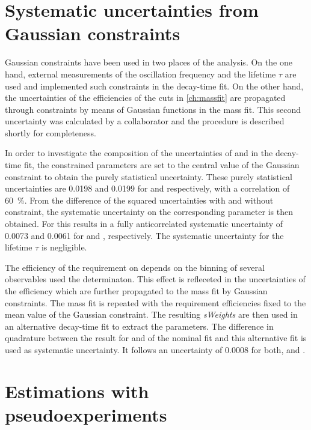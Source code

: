 \section{Systematic uncertainties from Gaussian constraints}
\label{sec:SystUncertsGauss}

Gaussian constraints have been used in two places of the analysis.
On the one hand, external measurements of the \Bz oscillation frequency \dm and the \Bz lifetime $\tau$ are used and implemented such constraints in the decay-time fit.
On the other hand, the uncertainties of the efficiencies of the \dllkpi cuts in \cref{ch:massfit} are propagated through constraints by means of Gaussian functions in the mass fit.
This second uncertainty was calculated by a collaborator and the procedure is described shortly for completeness.

In order to investigate the composition of the uncertainties of \Sf and \Sfbar in the decay-time fit, the constrained parameters are set to the central value of the Gaussian constraint to obtain the purely statistical uncertainty.
These purely statistical uncertainties are \num{0.0198} and \num{0.0199} for \Sf and \Sfbar respectively, with a correlation of \SI{60}{\percent}.
From the difference of the squared uncertainties with and without constraint, the systematic uncertainty on the corresponding parameter is then obtained.
For \dm this results in a fully anticorrelated systematic uncertainty of \num{0.0073} and \num{0.0061} for \Sf and \Sfbar, respectively.
The systematic uncertainty for the \Bz lifetime $\tau$ is negligible.

The efficiency of the requirement on \dllkpi depends on the binning of several observables used the determinaton.
This effect is refleceted in the uncertainties of the efficiency which are further propagated to the mass fit by Gaussian constraints.
The mass fit is repeated with the \dllkpi requirement efficiencies fixed to the mean value of the Gaussian constraint.
The resulting \emph{sWeights} are then used in an alternative decay-time fit to extract the \CP parameters.
The difference in quadrature between the result for \Sf and \Sfbar of the nominal fit and this alternative fit is used as systematic uncertainty.
It follows an uncertainty of \num{0.0008} for both, \Sf and \Sfbar.

\section{Estimations with pseudoexperiments}
\label{sec:systUncertsPseudo}

